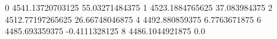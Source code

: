 0 4541.13720703125 55.03271484375
1 4523.1884765625 37.083984375
2 4512.77197265625 26.66748046875
4 4492.880859375 6.7763671875
6 4485.693359375 -0.4111328125
8 4486.1044921875 0.0
